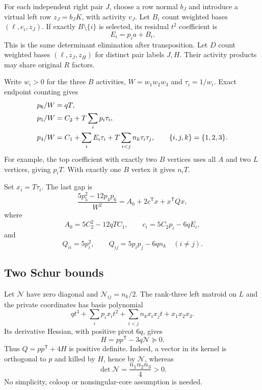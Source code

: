 \documentclass[11pt,a4paper]{article}
\theoremstyle{remark}\newtheorem{remark}[theorem]{Remark}
\begin{document}
For each independent right pair $J$, choose a row normal $b_J$ and introduce a virtual left row $z_J=b_JK$, with activity $v_J$. Let $B_i$ count weighted bases $(\ell,e_i,z_J)$. If exactly $B\setminus\{i\}$ is selected, its residual $t^2$ coefficient is
\begin{equation}\label{mrn:s:lg:eq:E}
 E_i=p_i a+B_i.
\end{equation}
This is the same determinant elimination after transposition. Let $D$ count weighted bases $(\ell,z_J,z_H)$ for distinct pair labels $J,H$. Their activity products may share original $R$ factors.

Write $w_i>0$ for the three $B$ activities, $W=w_1w_2w_3$ and $\tau_i=1/w_i$. Exact endpoint counting gives
\begin{align}
 p_6/W&=qT,\notag\\
 p_5/W&=C_2+T\sum_i p_i\tau_i,\label{mrn:s:lg:eq:top}\\
 p_4/W&=C_1+\sum_iE_i\tau_i+
       T\sum_{i<j}n_k\tau_i\tau_j,\qquad \{i,j,k\}=\{1,2,3\}.\notag
\end{align}
For example, the top coefficient with exactly two $B$ vertices uses all $A$ and two $L$ vertices, giving $p_iT$. With exactly one $B$ vertex it gives $n_iT$.

Set $x_i=T\tau_i$. The last gap is
\begin{equation}\label{mrn:s:lg:eq:quadratic}
 \frac{5p_5^2-12p_4p_6}{W^2}
       =A_0+2c^{\mathsf T}x+x^{\mathsf T}Qx,
\end{equation}
where
\[
 A_0=5C_2^2-12qTC_1,\qquad
 c_i=5C_2p_i-6qE_i,
\]
and
\begin{equation}\label{mrn:s:lg:eq:Q}
 Q_{ii}=5p_i^2,\qquad Q_{ij}=5p_ip_j-6qn_k\quad(i\ne j).
\end{equation}

\subsection{Two Schur bounds}
Let $\mathcal N$ have zero diagonal and $\mathcal N_{ij}=n_k/2$. The rank-three left matroid on $L$ and the private coordinates has basis polynomial
\[
 qt^3+\sum_i p_ix_it^2+\sum_{i<j}n_kx_ix_jt+x_1x_2x_3.
\]
Its derivative Hessian, with positive pivot $6q$, gives
\begin{equation}\label{mrn:s:lg:eq:H}
 H=pp^{\mathsf T}-3q\mathcal N\succeq0.
\end{equation}
Thus $Q=pp^{\mathsf T}+4H$ is positive definite. Indeed, a vector in its kernel is orthogonal to $p$ and killed by $H$, hence by $\mathcal N$, whereas
\[
 \det\mathcal N=\frac{n_1n_2n_3}{4}>0.
\]
No simplicity, coloop or nonsingular-core assumption is needed.
\end{document}
